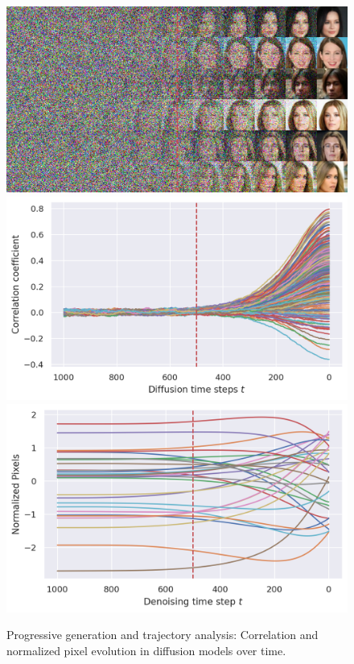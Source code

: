 \begin{figure}[ht!]
    \includegraphics[width=\linewidth]{figs/imgs/celeba64_progressive_generation.png}
\endminipage\hfill
{}
  \includegraphics[width=\linewidth]{figs/plots/celeba64_correlation_trajectories.png}
\endminipage\hfill
{}
  \includegraphics[width=\linewidth]{figs/plots/celeba64_normalized_trajectories_flipped.png}
\endminipage\hfill
\caption{Progressive generation and trajectory analysis: Correlation and normalized pixel evolution in diffusion models over time.}%
\end{figure}



